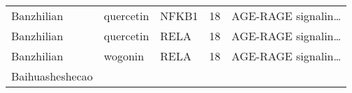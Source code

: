 \documentclass[
]{article}
\begin{document}
\begin{longtable}[]{@{}lllll@{}}
\begin{minipage}[t]{0.17\columnwidth}\raggedright
Banzhilian\strut
\end{minipage} & \begin{minipage}[t]{0.16\columnwidth}\raggedright
quercetin\strut
\end{minipage} & \begin{minipage}[t]{0.12\columnwidth}\raggedright
NFKB1\strut
\end{minipage} & \begin{minipage}[t]{0.19\columnwidth}\raggedright
18\strut
\end{minipage} & \begin{minipage}[t]{0.21\columnwidth}\raggedright
AGE-RAGE signalin\ldots{}\strut
\end{minipage}\tabularnewline
\begin{minipage}[t]{0.17\columnwidth}\raggedright
Banzhilian\strut
\end{minipage} & \begin{minipage}[t]{0.16\columnwidth}\raggedright
quercetin\strut
\end{minipage} & \begin{minipage}[t]{0.12\columnwidth}\raggedright
RELA\strut
\end{minipage} & \begin{minipage}[t]{0.19\columnwidth}\raggedright
18\strut
\end{minipage} & \begin{minipage}[t]{0.21\columnwidth}\raggedright
AGE-RAGE signalin\ldots{}\strut
\end{minipage}\tabularnewline
\begin{minipage}[t]{0.17\columnwidth}\raggedright
Banzhilian\strut
\end{minipage} & \begin{minipage}[t]{0.16\columnwidth}\raggedright
wogonin\strut
\end{minipage} & \begin{minipage}[t]{0.12\columnwidth}\raggedright
RELA\strut
\end{minipage} & \begin{minipage}[t]{0.19\columnwidth}\raggedright
18\strut
\end{minipage} & \begin{minipage}[t]{0.21\columnwidth}\raggedright
AGE-RAGE signalin\ldots{}\strut
\end{minipage}\tabularnewline
\begin{minipage}[t]{0.17\columnwidth}\raggedright
Baihuasheshecao\strut

\end{minipage}
\end{longtable}
\end{document}
